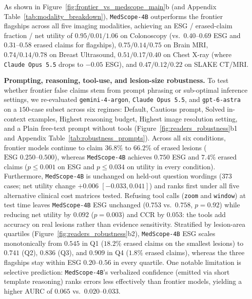 \documentclass[5p,times,twocolumn,authoryear]{elsarticle}
\begin{document}
As shown in Figure~\ref{fig:frontier_vs_medscope_main}b (and Appendix Table~\ref{tab:modality_breakdown}), \texttt{MedScope-4B} outperforms the frontier flagships across all five imaging modalities, achieving an ESG / erased-claim fraction / net utility of $0.95 / 0.01 / 1.06$ on Colonoscopy (vs.\ $0.40\text{--}0.69$ ESG and $0.31\text{--}0.58$ erased claims for flagships), $0.75 / 0.14 / 0.75$ on Brain MRI, $0.74 / 0.14 / 0.78$ on Breast Ultrasound, $0.51 / 0.17 / 0.40$ on Chest X-ray (where \texttt{Claude Opus 5.5} drops to $-0.05$ ESG), and $0.47 / 0.12 / 0.22$ on SLAKE CT/MRI.

\textbf{Prompting, reasoning, tool-use, and lesion-size robustness.} To test whether frontier false claims stem from prompt phrasing or sub-optimal inference settings, we re-evaluated \texttt{gemini-4-argon}, \texttt{Claude Opus 5.5}, and \texttt{gpt-6-astra} on a $150$-case subset across six regimes: Default, Cautious prompt, Solved in-context examples, Highest reasoning budget, Highest image resolution setting, and a Plain free-text prompt without tools (Figure~\ref{fig:readers_robustness}b1 and Appendix Table~\ref{tab:robustness_prompts}). Across all six conditions, frontier models continue to claim $36.8\%$ to $66.2\%$ of erased lesions ($\text{ESG } 0.250\text{--}0.500$), whereas \texttt{MedScope-4B} achieves $0.750$ ESG and $7.4\%$ erased claims ($p \le 0.001$ on ESG and $p \le 0.034$ on utility in every condition). Furthermore, \texttt{MedScope-4B} is unchanged on held-out question wordings ($373$ cases; net utility change $+0.006$ $[-0.033, 0.041]$) and ranks first under all five alternative clinical cost matrices tested. Refusing tool calls (\texttt{zoom} and \texttt{window}) at test time leaves \texttt{MedScope-4B} ESG unchanged ($0.753$ vs.\ $0.758$, $p = 0.92$) while reducing net utility by $0.092$ ($p = 0.003$) and CCR by $0.053$: the tools add accuracy on real lesions rather than evidence sensitivity. Stratified by lesion-area quartiles (Figure~\ref{fig:readers_robustness}b2), \texttt{MedScope-4B} ESG scales monotonically from $0.545$ in Q1 ($18.2\%$ erased claims on the smallest lesions) to $0.741$ (Q2), $0.836$ (Q3), and $0.909$ in Q4 ($1.8\%$ erased claims), whereas the three flagships stay within ESG $0.20\text{--}0.56$ in every quartile. One notable limitation is selective prediction: \texttt{MedScope-4B}'s verbalized confidence (emitted via short template reasoning) ranks errors less effectively than frontier models, yielding a higher AURC of $0.065$ vs.\ $0.020\text{--}0.033$.
\end{document}
